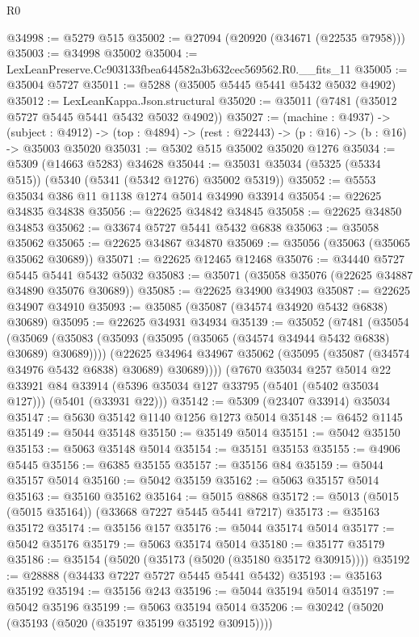 \begin{lexlean}{R0}
\begin{coremodule}
@34998 := @5279 @515
@35002 := @27094 (@20920 (@34671 (@22535 @7958)))
@35003 := @34998 @35002
@35004 := LexLeanPreserve.Cc903133fbea644582a3b632cec569562.R0.__fits_11
@35005 := @35004 @5727
@35011 := @5288 (@35005 @5445 @5441 @5432 @5032 @4902)
@35012 := LexLeanKappa.Json.structural
@35020 := @35011 (@7481 (@35012 @5727 @5445 @5441 @5432 @5032 @4902))
@35027 := (machine : @4937) ->
  (subject : @4912) -> (top : @4894) -> (rest : @22443) -> (p : @16) -> (b : @16) -> @35003 @35020
@35031 := @5302 @515 @35002 @35020 @1276
@35034 := @5309 (@14663 @5283) @34628
@35044 := @35031 @35034 (@5325 (@5334 @515)) (@5340 (@5341 (@5342 @1276) @35002 @5319))
@35052 := @5553 @35034 @386 @11 @1138 @1274 @5014 @34990 @33914
@35054 := @22625 @34835 @34838
@35056 := @22625 @34842 @34845
@35058 := @22625 @34850 @34853
@35062 := @33674 @5727 @5441 @5432 @6838
@35063 := @35058 @35062
@35065 := @22625 @34867 @34870
@35069 := @35056 (@35063 (@35065 @35062 @30689))
@35071 := @22625 @12465 @12468
@35076 := @34440 @5727 @5445 @5441 @5432 @5032
@35083 := @35071 (@35058 @35076 (@22625 @34887 @34890 @35076 @30689))
@35085 := @22625 @34900 @34903
@35087 := @22625 @34907 @34910
@35093 := @35085 (@35087 (@34574 @34920 @5432 @6838) @30689)
@35095 := @22625 @34931 @34934
@35139 := @35052
    (@7481
      (@35054
        (@35069 (@35083 (@35093 (@35095 (@35065 (@34574 @34944 @5432 @6838) @30689) @30689))))
        (@22625 @34964 @34967 @35062 (@35095 (@35087 (@34574 @34976 @5432 @6838) @30689) @30689))))
    (@7670
      @35034
      @257
      @5014
      @22
      @33921
      @84
      @33914
      (@5396 @35034 @127 @33795 (@5401 (@5402 @35034 @127)))
      (@5401 (@33931 @22)))
@35142 := @5309 (@23407 @33914) @35034
@35147 := @5630 @35142 @1140 @1256 @1273 @5014
@35148 := @6452 @1145
@35149 := @5044 @35148
@35150 := @35149 @5014
@35151 := @5042 @35150
@35153 := @5063 @35148 @5014
@35154 := @35151 @35153
@35155 := @4906 @5445
@35156 := @6385 @35155
@35157 := @35156 @84
@35159 := @5044 @35157 @5014
@35160 := @5042 @35159
@35162 := @5063 @35157 @5014
@35163 := @35160 @35162
@35164 := @5015 @8868
@35172 := @5013 (@5015 (@5015 @35164)) (@33668 @7227 @5445 @5441 @7217)
@35173 := @35163 @35172
@35174 := @35156 @157
@35176 := @5044 @35174 @5014
@35177 := @5042 @35176
@35179 := @5063 @35174 @5014
@35180 := @35177 @35179
@35186 := @35154 (@5020 (@35173 (@5020 (@35180 @35172 @30915))))
@35192 := @28888 (@34433 @7227 @5727 @5445 @5441 @5432)
@35193 := @35163 @35192
@35194 := @35156 @243
@35196 := @5044 @35194 @5014
@35197 := @5042 @35196
@35199 := @5063 @35194 @5014
@35206 := @30242 (@5020 (@35193 (@5020 (@35197 @35199 @35192 @30915))))

\end{coremodule}
\end{lexlean}
